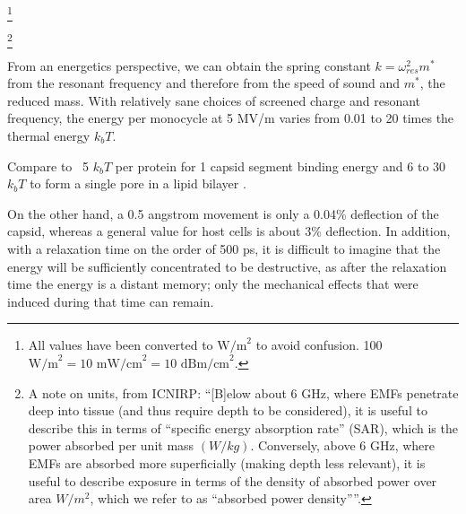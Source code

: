 \documentclass[paper.tex]{subfiles}
\begin{document}
\begin{multicols}{1}
\footnote{All values have been converted to $\text{W/m}^2$ to avoid confusion. 100 $\text{W/m}^2 = 10 \text{ mW/cm}^2 = 10 \text{ dBm/cm}^2$.}


%
%
%
%
%
%
%
%
%
%
%




\footnote{A note on units, from ICNIRP: ``{[B]elow about 6 GHz, where EMFs penetrate deep into tissue (and thus require depth to be considered), it is useful to describe this in terms of “specific energy absorption rate” (SAR), which is the power absorbed per unit mass $(W/kg)$. Conversely, above 6 GHz, where EMFs are absorbed more superficially (making depth less relevant), it is useful to describe exposure in terms of the density of absorbed power over area $W/m^2$, which we refer to as “absorbed power density”}''. }



 
From an energetics perspective, we can obtain the spring constant $k = \omega_{res}^2 m^*$ from the resonant frequency and therefore from the speed of sound and $m^*$, the reduced mass. With relatively sane choices of screened charge and resonant frequency, the energy per monocycle at 5 MV/m varies from 0.01 to 20 times the thermal energy $k_b T$. 

Compare to ~5 $k_b T$ per protein for 1 capsid segment binding energy \cite{Energies2012} \cite{Weak2002} and 6 to 30 $k_b T$ to form a single pore in a lipid bilayer \cite{Atomistic2014a}.

On the other hand, a 0.5 angstrom movement is only a 0.04\% deflection of the capsid, whereas a general value for host cells is about 3\% deflection. In addition, with a relaxation time on the order of 500 ps, it is difficult to imagine that the energy will be sufficiently concentrated to be destructive, as after the relaxation time the energy is a distant memory; only the mechanical effects that were induced during that time can remain.


\end{multicols}
\end{document}
